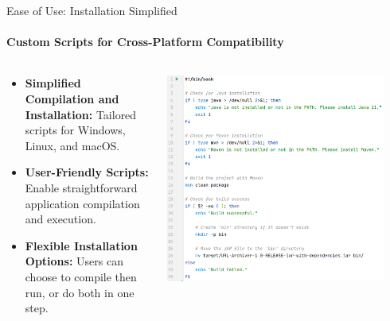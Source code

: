 \documentclass[
ngerman,%
authorontitle=true,
]{bfhbeamer}
\begin{document}
	\begin{frame}{Ease of Use: Installation Simplified}
		\framesubtitle{Custom Scripts for Cross-Platform Compatibility}
		\begin{columns} %
			\begin{column}{0.6\textwidth} %
				\begin{itemize}
					\item \textbf{Simplified Compilation and Installation:} Tailored scripts for Windows, Linux, and macOS.
					\item \textbf{User-Friendly Scripts:} Enable straightforward application compilation and execution.
					\item \textbf{Flexible Installation Options:} Users can choose to compile then run, or do both in one step.
				\end{itemize}
			\end{column}
			\begin{column}{0.4\textwidth} %
				\begin{center}
					\includegraphics[width=0.9\textwidth]{pictures/final_presentation/build_script.png}
				\end{center}
			\end{column}
		\end{columns} %
	\end{frame}
	
\end{document}
